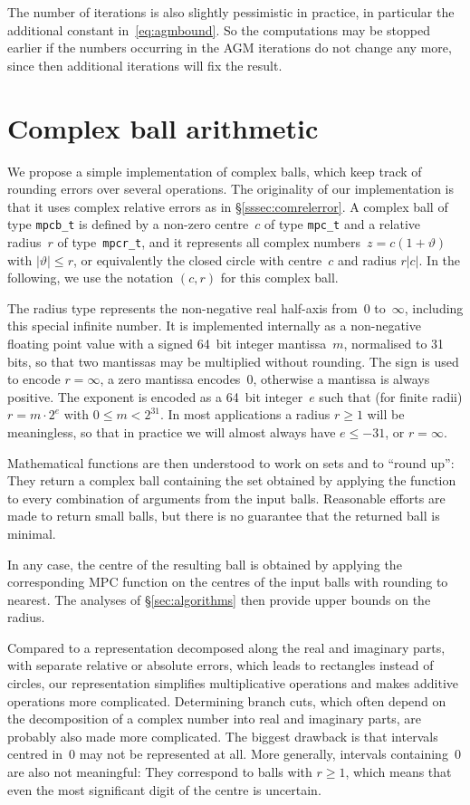 \documentclass [11pt]{article}
\renewcommand {\theta}{\vartheta}
\renewcommand {\leq}{\leqslant}
\renewcommand {\geq}{\geqslant}
\begin{document}
The number of iterations is also slightly pessimistic in practice,
in particular the additional constant in~\eqref {eq:agmbound}.
So the computations may be stopped earlier if the numbers occurring in
the AGM iterations do not change any more, since then additional
iterations will fix the result.

\section {Complex ball arithmetic}

We propose a simple implementation of complex balls, which keep track of
rounding errors over several operations.
The originality of our implementation is that it uses complex relative
errors as in \S\ref {sssec:comrelerror}. A complex ball of type
\texttt {mpcb\_t} is defined by a non-zero centre~$c$ of type
\texttt {mpc\_t} and a relative radius~$r$ of type~\texttt {mpcr\_t},
and it represents all complex numbers~$z = c (1 + \theta)$ with
$|\theta| \leq r$, or equivalently the closed circle with centre~$c$ and
radius $r |c|$.
In the following, we use the notation $(c, r)$ for this complex ball.

The radius type represents the non-negative real half-axis from~$0$
to~$\infty$, including this special infinite number. It is implemented
internally as a non-negative floating point value with a signed 64~bit
integer mantissa~$m$, normalised to 31 bits, so that two mantissas may be
multiplied without rounding. The sign is used to encode $r = \infty$,
a zero mantissa encodes~$0$, otherwise a mantissa is always positive.
The exponent is encoded as a 64~bit integer~$e$ such that (for finite radii)
$r = m \cdot 2^e$ with $0 \leq m < 2^{31}$.
In most applications a radius $r \geq 1$ will be meaningless, so that
in practice we will almost always have $e \leq -31$, or $r = \infty$.

Mathematical functions are then understood to work on sets and to ``round
up'': They return a complex ball containing the set obtained by applying
the function to every combination of arguments from the input balls.
Reasonable efforts are made to return small balls, but there is no
guarantee that the returned ball is minimal.

In any case, the centre of the resulting ball is obtained by applying
the corresponding MPC function on the centres of the input balls with
rounding to nearest. The analyses of \S\ref {sec:algorithms} then provide
upper bounds on the radius.

Compared to a representation decomposed along the real and imaginary parts,
with separate relative or absolute errors, which leads to rectangles
instead of circles, our representation simplifies multiplicative operations
and makes additive operations more complicated. Determining branch cuts,
which often depend on the decomposition of a complex number into real and
imaginary parts, are probably also made more complicated.
The biggest drawback is that intervals centred in~$0$ may not be
represented at all. More generally, intervals containing~$0$ are also
not meaningful: They correspond to balls with $r \geq 1$, which means that
even the most significant digit of the centre is uncertain.
\end{document}
